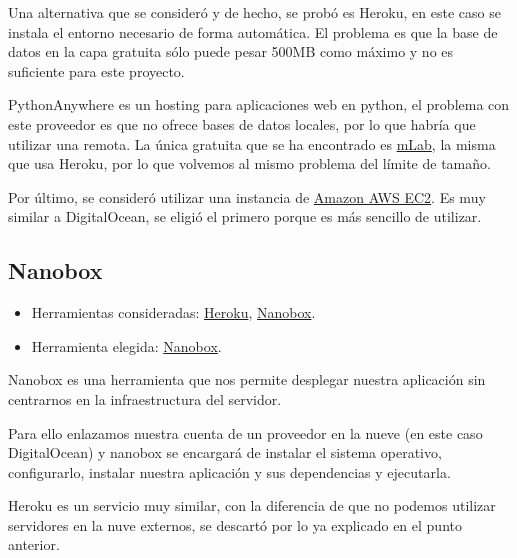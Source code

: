 Una alternativa que se consideró y de hecho, se probó es Heroku, en este caso se instala el entorno necesario de forma automática. El problema es que la base de datos en la capa gratuita sólo puede pesar 500MB como máximo y no es suficiente para este proyecto.

PythonAnywhere es un hosting para aplicaciones web en python, el problema con este proveedor es que no ofrece bases de datos locales, por lo que habría que utilizar una remota. La única gratuita que se ha encontrado es \href{https://mlab.com/}{mLab}, la misma que usa Heroku, por lo que volvemos al mismo problema del límite de tamaño.

Por último, se consideró utilizar una instancia de \href{https://aws.amazon.com/es/ec2/}{Amazon AWS EC2}. Es muy similar a DigitalOcean, se eligió el primero porque es más sencillo de utilizar.

\subsection{Nanobox}
\begin{itemize}
	\tightlist
	\item
	Herramientas consideradas:
	\href{https://www.heroku.com/}{Heroku}, 
	\href{https://nanobox.io/}{Nanobox}.
	\item
	Herramienta elegida:
	\href{https://nanobox.io/}{Nanobox}.
\end{itemize}

Nanobox\cite{docs:nanobox} es una herramienta que nos permite desplegar nuestra aplicación sin centrarnos en la infraestructura del servidor.

Para ello enlazamos nuestra cuenta de un proveedor en la nueve (en este caso DigitalOcean) y nanobox se encargará de instalar el sistema operativo, configurarlo, instalar nuestra aplicación y sus dependencias y ejecutarla.

Heroku es un servicio muy similar, con la diferencia de que no podemos utilizar servidores en la nuve externos, se descartó por lo ya explicado en el punto anterior.

